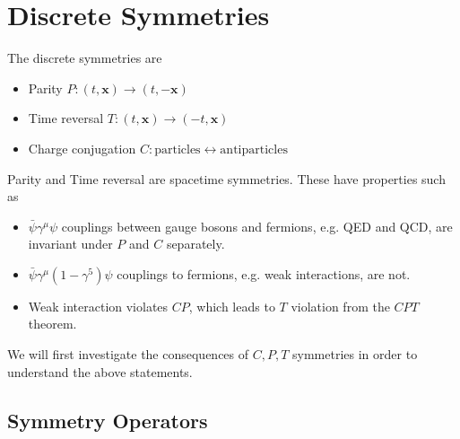 \documentclass{article}
\begin{document}
\section{Discrete Symmetries}
The discrete symmetries are 
\begin{itemize}
    \item Parity $P : (t,\bm{x}) \to (t,-\bm{x})$
    \item Time reversal $T : (t,\bm{x}) \to (-t,\bm{x})$
    \item Charge conjugation $C : \text{particles} \leftrightarrow \text{antiparticles} $
\end{itemize}
Parity and Time reversal are spacetime symmetries. These have properties such as 
\begin{itemize}
    \item $\bar{\psi}\gamma^\mu \psi$ couplings between gauge bosons and fermions,  e.g. QED and QCD, are invariant under $P$ and $C$ separately.  
    \item $\bar{\psi}\gamma^\mu (1-\gamma^5) \psi$ couplings to fermions, e.g. weak interactions, are not.
    \item Weak interaction violates $CP$, which leads to $T$ violation from the $CPT$ theorem. 
\end{itemize}
We will first investigate the consequences of $C,P,T$ symmetries in order to understand the above statements. 

\subsection{Symmetry Operators} 
\end{document}
